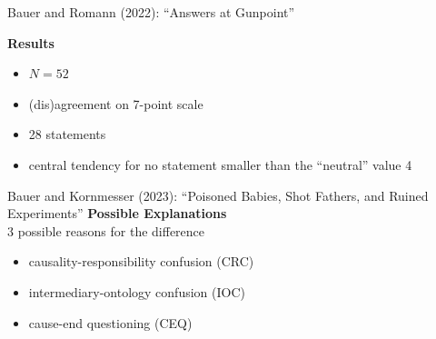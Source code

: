 \documentclass[xcolor=table,9pt,aspectratio=169]{beamer}
\begin{document}
\begin{frame}{\vspace*{10mm}Bauer and Romann (2022): ``Answers at Gunpoint''}
\vspace*{-5mm}
\begin{multicols}{2}
\textbf{Results}\\
\begin{itemize}
   \item $N=52$
   \item (dis)agreement on 7-point scale
   \item 28 statements
   \item central tendency for no statement smaller than the ``neutral'' value 4
\end{itemize}
\vfill
\begin{center}
\end{center}
\end{multicols}
\end{frame}


\begin{frame}{\vspace*{10mm}Bauer and Kornmesser (2023): ``Poisoned Babies, Shot Fathers, and Ruined Experiments''}
\vspace*{-5mm}
\textbf{Possible Explanations}\\
3 possible reasons for the difference
\begin{itemize}
   \item causality-responsibility confusion (CRC)
   \item intermediary-ontology confusion (IOC)
   \item cause-end questioning (CEQ)
\end{itemize}
\vfill
\end{frame}
\end{document}
